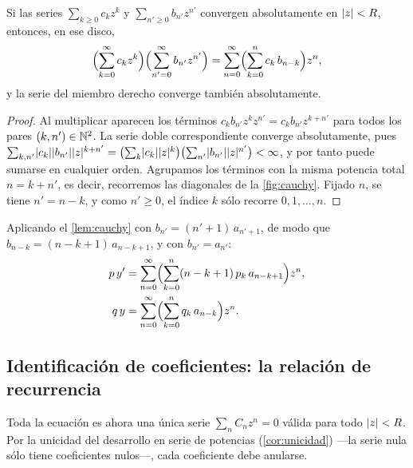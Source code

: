 \begin{lema}\label{lem:cauchy}
Si las series $\sum_{k\ge0}c_kz^{k}$ y $\sum_{n'\ge0}b_{n'}z^{n'}$ convergen
absolutamente en $\lvert z\rvert<R$, entonces, en ese disco,
\begin{equation}\label{eq:cauchy}
  \Bigl(\sum_{k=0}^{\infty}c_k z^{k}\Bigr)\Bigl(\sum_{n'=0}^{\infty}b_{n'}z^{n'}\Bigr)
  =\sum_{n=0}^{\infty}\Bigl(\sum_{k=0}^{n}c_k\,b_{n-k}\Bigr)z^{n},
\end{equation}
y la serie del miembro derecho converge también absolutamente.
\end{lema}

\begin{proof}
Al multiplicar aparecen los términos $c_kb_{n'}z^{k}z^{n'}=c_kb_{n'}z^{k+n'}$
para todos los pares $(k,n')\in\mathbb{N}^{2}$. La serie doble correspondiente
converge absolutamente, pues
$\sum_{k,n'}\lvert c_k\rvert\lvert b_{n'}\rvert\lvert z\rvert^{k+n'}
=\bigl(\sum_k\lvert c_k\rvert\lvert z\rvert^k\bigr)\bigl(\sum_{n'}\lvert b_{n'}\rvert\lvert z\rvert^{n'}\bigr)<\infty$,
y por tanto puede sumarse en cualquier orden. Agrupamos los términos con la
misma potencia total $n=k+n'$, es decir, recorremos las diagonales de la
\cref{fig:cauchy}. Fijado $n$, se tiene $n'=n-k$, y como $n'\ge0$, el
índice $k$ sólo recorre $0,1,\dots,n$.
\end{proof}



Aplicando el \cref{lem:cauchy} con $b_{n'}=(n'+1)\,a_{n'+1}$, de modo que
$b_{n-k}=(n-k+1)\,a_{n-k+1}$, y con $b_{n'}=a_{n'}$:
\begin{align}
  p\,y' &=\sum_{n=0}^{\infty}\Bigl(\sum_{k=0}^{n}(n-k+1)\,p_k\,a_{n-k+1}\Bigr)z^{n},\label{eq:pyp}\\
  q\,y  &=\sum_{n=0}^{\infty}\Bigl(\sum_{k=0}^{n}q_k\,a_{n-k}\Bigr)z^{n}.\label{eq:qy}
\end{align}

\subsection{Identificación de coeficientes: la relación de recurrencia}\label{sec:recurrencia}
Toda la ecuación es ahora una única serie $\sum_n C_n z^{n}=0$ válida para
todo $\lvert z\rvert<R$. Por la unicidad del desarrollo en serie de potencias
(\cref{cor:unicidad}) ---la serie nula sólo tiene coeficientes nulos---,
cada coeficiente debe anularse.

